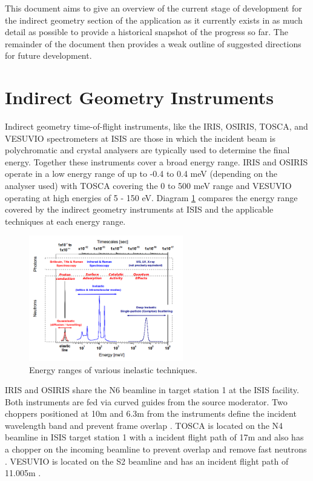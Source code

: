 \documentclass[paper=a4, fontsize=11pt]{scrartcl}	%
\numberwithin{equation}{section}															%
\numberwithin{figure}{section}																%
\numberwithin{table}{section}																%
\begin{document}
This document aims to give an overview of the current stage of development for the indirect geometry section of the application as it currently exists in as much detail as possible to provide a historical snapshot of the progress so far. The remainder of the document then provides a weak outline of suggested directions for future development.

\section{Indirect Geometry Instruments}
Indirect geometry time-of-flight instruments, like the IRIS, OSIRIS, TOSCA, and VESUVIO spectrometers at ISIS are those in which the incident beam is polychromatic and crystal analysers are typically used to determine the final energy. Together these instruments cover a broad energy range. IRIS and OSIRIS operate in a low energy range of up to -0.4 to 0.4 meV (depending on the analyser used) with TOSCA covering the 0 to 500 meV range and VESUVIO operating at high energies of 5 - 150 eV. Diagram \ref{fig:instrument-energy-range} compares the energy range covered by the indirect geometry instruments at ISIS and the applicable techniques at each energy range.

\begin{figure}[H]
\centering
\includegraphics[width=0.6\textwidth]{img/instrument-energy-chart.png}
\caption{Energy ranges of various inelastic techniques.}
\label{fig:instrument-energy-range}
\end{figure}

IRIS and OSIRIS share the N6 beamline in target station 1 at the ISIS facility. Both instruments are fed via curved guides from the source moderator. Two choppers positioned at 10m and 6.3m from the instruments define the incident wavelength band and prevent frame overlap \cite{smukhopadhyay2014}. TOSCA is located on the N4 beamline in ISIS target station 1 with a incident flight path of 17m and also has a chopper on the incoming beamline to prevent overlap and remove fast neutrons \cite{colognesi2002tosca}. VESUVIO is located on the S2 beamline and has an incident flight path of 11.005m \cite{mayers2011calibration}.
\end{document}
